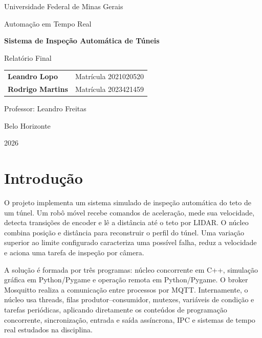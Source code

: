 \documentclass[12pt,a4paper]{article}
\begin{document}
\begin{titlepage}
    \centering
    \vspace*{1.5cm}
    {\Large Universidade Federal de Minas Gerais\par}
    \vspace{0.4cm}
    {\large Automação em Tempo Real\par}
    \vspace{2.0cm}
    {\Huge\bfseries Sistema de Inspeção Automática de Túneis\par}
    \vspace{0.6cm}
    {\Large Relatório Final\par}
    \vspace{2.3cm}

    \begin{tabular}{ll}
        \textbf{Leandro Lopo} & Matrícula 2021020520 \\
        \textbf{Rodrigo Martins} & Matrícula 2023421459
    \end{tabular}

    \vfill
    Professor: Leandro Freitas\par
    \vspace{0.5cm}
    Belo Horizonte\par
    2026
\end{titlepage}

\tableofcontents
\clearpage
\listoffigures
\clearpage
{}

\section{Introdução}

O projeto implementa um sistema simulado de inspeção automática do teto de um túnel. Um robô móvel recebe comandos de aceleração, mede sua velocidade, detecta transições de encoder e lê a distância até o teto por LIDAR. O núcleo combina posição e distância para reconstruir o perfil do túnel. Uma variação superior ao limite configurado caracteriza uma possível falha, reduz a velocidade e aciona uma tarefa de inspeção por câmera.

A solução é formada por três programas: núcleo concorrente em C++, simulação gráfica em Python/Pygame e operação remota em Python/Pygame. O broker Mosquitto realiza a comunicação entre processos por MQTT. Internamente, o núcleo usa threads, filas produtor--consumidor, mutexes, variáveis de condição e tarefas periódicas, aplicando diretamente os conteúdos de programação concorrente, sincronização, entrada e saída assíncrona, IPC e sistemas de tempo real estudados na disciplina.
\end{document}
